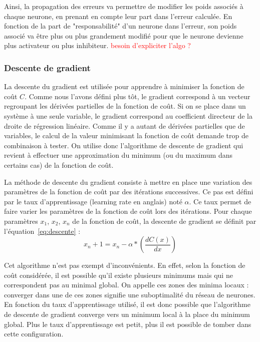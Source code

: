 Ainsi, la propagation des erreurs va permettre de modifier les poids associés à chaque neurone, en prenant en compte leur part dans l'erreur calculée. En fonction de la part de "responsabilité" d'un neurone dans l'erreur, son poids associé va être plus ou plus grandement modifié pour que le neurone devienne plus activateur ou plus inhibiteur.
\textcolor{red}{besoin d'expliciter l'algo ?}

\subsubsection{Descente de gradient}
La descente du gradient est utilisée pour apprendre à minimiser la fonction de coût $C$. Comme nous l'avons défini plus tôt, le gradient correspond à un vecteur regroupant les dérivées partielles de la fonction de coût. Si on se place dans un système à une seule variable, le gradient correspond au coefficient directeur de la droite de régression linéaire. Comme il y a autant de dérivées partielles que de variables, le calcul de la valeur minimisant la fonction de coût demande trop de combinaison à tester. On utilise donc l'algorithme de descente de gradient qui revient à effectuer une approximation du minimum (ou du maximum dans certains cas) de la fonction de coût.

La méthode de descente du gradient consiste à mettre en place une variation des paramètres de la fonction de coût par des itérations successives. Ce pas est défini par le taux d'apprentissage (learning rate en anglais) noté $\alpha$. Ce taux permet de faire varier les paramètres de la fonction de coût lors des itérations. Pour chaque paramètres $x_1$, $x_2$, $x_n$ de la fonction de coût, la descente de gradient se définit par l'équation~\ref{eq:descente} :
\begin{equation}
  x_n+1 = x_n - \alpha*(\dfrac{dC(x)}{dx})
  \label{eq:descente}
\end{equation}

Cet algorithme n'est pas exempt d'inconvénients. En effet, selon la fonction de coût considérée, il est possible qu'il existe plusieurs minimums mais qui ne correspondent pas au minimal global. On appelle ces zones des minima locaux : converger dans une de ces zones signifie une suboptimalité du réseau de neurones. En fonction du taux d'apprentissage utilisé, il est donc possible que l'algorithme de descente de gradient converge vers un minimum local à la place du minimum global. Plus le taux d'apprentissage est petit, plus il est possible de tomber dans cette configuration.

